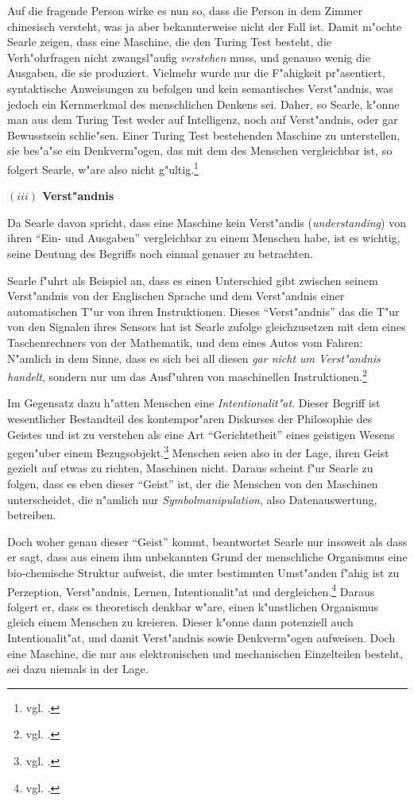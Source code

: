 \documentclass[a4paper, emulatestandardclasses, 12pt]{scrartcl}
\begin{document}
\begin{onehalfspace}
Auf die fragende Person wirke es nun so, dass die Person in dem Zimmer chinesisch versteht, was ja aber bekannterweise nicht der Fall ist. Damit m"ochte Searle zeigen, dass eine Maschine, die den Turing Test besteht, die Verh"ohrfragen nicht zwangsl"aufig \emph{verstehen} muss, und genauso wenig die Ausgaben, die sie produziert. Vielmehr wurde nur die F"ahigkeit pr"asentiert, syntaktische Anweisungen zu befolgen und kein semantisches Verst"andnis, was jedoch ein Kernmerkmal des menschlichen Denkens sei. Daher, so Searle, k"onne man aus dem Turing Test weder auf Intelligenz, noch auf Verst"andnis, oder gar Bewusstsein schlie"sen. Einer Turing Test bestehenden Maschine zu unterstellen, sie bes"a"se ein Denkverm"ogen, das mit dem des Menschen vergleichbar ist, so folgert Searle, w"are also nicht g"ultig.\footnote{vgl. \cite[S.424]{searle1980minds}.}

\vspace{5mm}
\noindent\textbf{$(iii)$ Verst"andnis}

\noindent Da Searle davon spricht, dass eine Maschine kein Verst"andis (\emph{understanding}) von ihren "`Ein- und Ausgaben"' vergleichbar zu einem Menschen habe, ist es wichtig, seine Deutung des Begriffs noch einmal genauer zu betrachten.

Searle f"uhrt als Beispiel an, dass es einen Unterschied gibt zwischen seinem Verst"andnis von der Englischen Sprache und dem Verst"andnis einer automatischen T"ur von ihren Instruktionen. Dieses "`Verst"andnis"' das die T"ur von den Signalen ihres Sensors hat ist  Searle zufolge gleichzusetzen mit dem eines Taschenrechners von der Mathematik, und dem eines Autos vom Fahren: N"amlich in dem Sinne, dass es sich bei all diesen \emph{gar nicht um Verst"andnis handelt}, sondern nur um das Ausf"uhren von maschinellen Instruktionen.\footnote{vgl. \cite[S.419]{searle1980minds}.}

Im Gegensatz dazu h"atten Menschen eine \emph{Intentionalit"at}. Dieser Begriff ist wesentlicher Bestandteil des kontempor"aren Diskurses der Philosophie des Geistes und ist zu verstehen als eine Art "`Gerichtetheit"' eines geistigen Wesens gegen"uber einem Bezugsobjekt.\footnote{vgl. \cite{sep-intentionality}.} Menschen seien also in der Lage, ihren Geist gezielt auf etwas zu richten, Maschinen nicht. Daraus scheint f"ur Searle zu folgen, dass es eben dieser "`Geist"' ist, der die Menschen von den Maschinen unterscheidet, die n"amlich nur \emph{Symbolmanipulation}, also Datenauswertung, betreiben. 

Doch woher genau dieser "`Geist"' kommt, beantwortet Searle nur insoweit als dass er sagt, dass aus einem ihm unbekannten Grund der menschliche Organismus eine bio-chemische Struktur aufweist, die unter bestimmten Umst"anden f"ahig ist zu Perzeption, Verst"andnis, Lernen, Intentionalit"at und dergleichen.\footnote{vgl. \cite[S.422]{searle1980minds}.} Daraus folgert er, dass es theoretisch denkbar w"are, einen k"unstlichen Organismus gleich einem Menschen zu kreieren. Dieser k"onne dann potenziell auch Intentionalit"at, und damit Verst"andnis sowie Denkverm"ogen aufweisen. Doch eine Maschine, die nur aus elektronischen und mechanischen Einzelteilen besteht, sei dazu niemals in der Lage. 


\end{onehalfspace}
\end{document}
